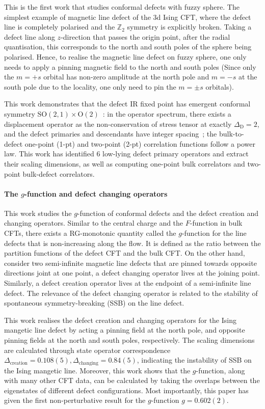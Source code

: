 \documentclass{timesjhep}
\begin{document}
This is the first work that studies conformal defects with fuzzy sphere. The simplest example of magnetic line defect of the 3d Ising CFT, where the defect line is completely polarised and the $\mathbb{Z}_2$ symmetry is explicitly broken. Taking a defect line along $z$-direction that passes the origin point, after the radial quantisation, this corresponds to the north and south poles of the sphere being polarised. Hence, to realise the magnetic line defect on fuzzy sphere, one only needs to apply a pinning magnetic field to the north and south poles (Since only the $m=+s$ orbital has non-zero amplitude at the north pole and $m=-s$ at the south pole due to the locality, one only need to pin the $m=\pm s$ orbitals). 

This work demonstrates that the defect IR fixed point has emergent conformal symmetry $\mathrm{SO}(2,1)\times\mathrm{O}(2)$~: in the operator spectrum, there exists a displacement operator as the non-conservation of stress tensor at exactly $\Delta_\mathrm{D}=2$, and the defect primaries and descendants have integer spacing~; the bulk-to-defect one-point (1-pt) and two-point (2-pt) correlation functions follow a power law. This work has identified 6 low-lying defect primary operators and extract their scaling dimensions, as well as computing one-point bulk correlators and two-point bulk-defect correlators. 

\paragraph{The $g$-function and defect changing operators~\cite{Zhou2024Jan}}

This work studies the $g$-function of conformal defects and the defect creation and changing operators. Similar to the central charge and the $F$-function in bulk CFTs, there exists a RG-monotonic quantity called the $g$-function for the line defects that is non-increasing along the flow. It is defined as the ratio between the partition functions of the defect CFT and the bulk CFT. On the other hand, consider two semi-infinite magnetic line defects that are pinned towards opposite directions joint at one point, a defect changing operator lives at the joining point. Similarly, a defect creation operator lives at the endpoint of a semi-infinite line defect. The relevance of the defect changing operator is related to the stability of spontaneous symmetry-breaking (SSB) on the line defect. 

This work realises the defect creation and changing operators for the Ising mangetic line defect by acting a pinning field at the north pole, and opposite pinning fields at the north and south poles, respectively. The scaling dimensions are calculated through state operator correspondence $\Delta_{\mathrm{creation}}=0.108(5),\Delta_{\mathrm{changing}}=0.84(5)$, indicating the instability of SSB on the Ising mangetic line. Moreover, this work shows that the $g$-function, along with many other CFT data, can be calculated by taking the overlaps between the eigenstates of different defect configurations. Most importantly, this paper has given the first non-perturbative result for the $g$-function $g=0.602(2)$. 
\end{document}
